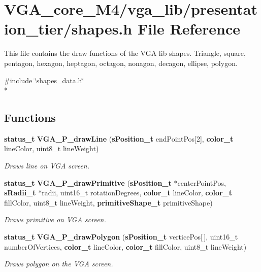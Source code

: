 \section{V\+G\+A\+\_\+core\+\_\+\+M4/vga\+\_\+lib/presentation\+\_\+tier/shapes.h File Reference}
\label{shapes_8h}


This file contains the draw functions of the V\+GA lib shapes. Triangle, square, pentagon, hexagon, heptagon, octagon, nonagon, decagon, ellipse, polygon.  


{\ttfamily \#include \char`\"{}shapes\+\_\+data.\+h\char`\"{}}\\*
\subsection*{Functions}
\begin{DoxyCompactItemize}
\item 
{\bf status\+\_\+t} {\bf V\+G\+A\+\_\+\+P\+\_\+draw\+Line} ({\bf s\+Position\+\_\+t} end\+Point\+Pos[2], {\bf color\+\_\+t} line\+Color, uint8\+\_\+t line\+Weight)
\begin{DoxyCompactList}\small\item\em Draws line on V\+GA screen. \end{DoxyCompactList}\item 
{\bf status\+\_\+t} {\bf V\+G\+A\+\_\+\+P\+\_\+draw\+Primitive} ({\bf s\+Position\+\_\+t} $\ast$center\+Point\+Pos, {\bf s\+Radii\+\_\+t} $\ast$radii, uint16\+\_\+t rotation\+Degrees, {\bf color\+\_\+t} line\+Color, {\bf color\+\_\+t} fill\+Color, uint8\+\_\+t line\+Weight, {\bf primitive\+Shape\+\_\+t} primitive\+Shape)
\begin{DoxyCompactList}\small\item\em Draws primitive on V\+GA screen. \end{DoxyCompactList}\item 
{\bf status\+\_\+t} {\bf V\+G\+A\+\_\+\+P\+\_\+draw\+Polygon} ({\bf s\+Position\+\_\+t} vertice\+Pos[$\,$], uint16\+\_\+t number\+Of\+Vertices, {\bf color\+\_\+t} line\+Color, {\bf color\+\_\+t} fill\+Color, uint8\+\_\+t line\+Weight)
\begin{DoxyCompactList}\small\item\em Draws polygon on the V\+GA screen. \end{DoxyCompactList}\end{DoxyCompactItemize}


